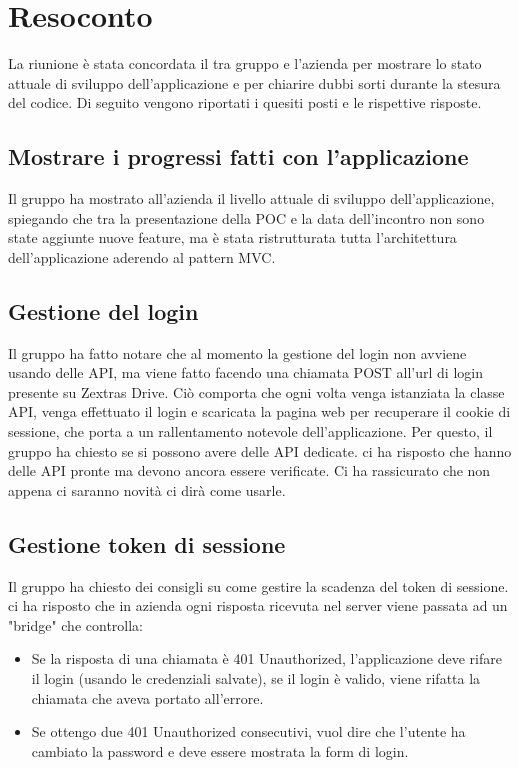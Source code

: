 \section{Resoconto}

La riunione è stata concordata il tra gruppo \textit{\Gruppo{}} e l'azienda per mostrare lo stato attuale di sviluppo dell'applicazione e per chiarire dubbi sorti durante la stesura del codice. Di seguito vengono riportati i quesiti posti e le rispettive risposte. 

\subsection{Mostrare i progressi fatti con l'applicazione}
Il gruppo ha mostrato all'azienda il livello attuale di sviluppo dell'applicazione, spiegando che tra la presentazione della POC e la data dell'incontro non sono state aggiunte nuove feature, 
ma è stata ristrutturata tutta l'architettura dell'applicazione aderendo al pattern MVC.

\subsection{Gestione del login}
Il gruppo ha fatto notare che al momento la gestione del login non avviene usando delle API, ma viene fatto facendo una chiamata POST all'url di login presente su Zextras Drive.
Ciò comporta che ogni volta venga istanziata la classe API, venga effettuato il login e scaricata la pagina web per recuperare il cookie di sessione, che porta a un rallentamento notevole dell'applicazione. Per questo, il gruppo ha chiesto se si possono avere delle API dedicate. \Federico{} ci ha risposto che hanno delle API pronte ma devono ancora essere verificate. Ci ha rassicurato che non appena ci saranno novità ci dirà come usarle.

\subsection{Gestione token di sessione}
Il gruppo ha chiesto dei consigli su come gestire la scadenza del token di sessione. \Alessio{} ci ha risposto che in azienda ogni risposta ricevuta nel server viene passata ad un "bridge" che controlla:
\begin{itemize}
    \item Se la risposta di una chiamata è 401 Unauthorized, l'applicazione deve rifare il login (usando le credenziali salvate), se il login è valido, viene rifatta la chiamata che aveva portato all'errore.
    \item Se ottengo due 401 Unauthorized consecutivi, vuol dire che l'utente ha cambiato la password e deve essere mostrata la form di login.
\end{itemize}

